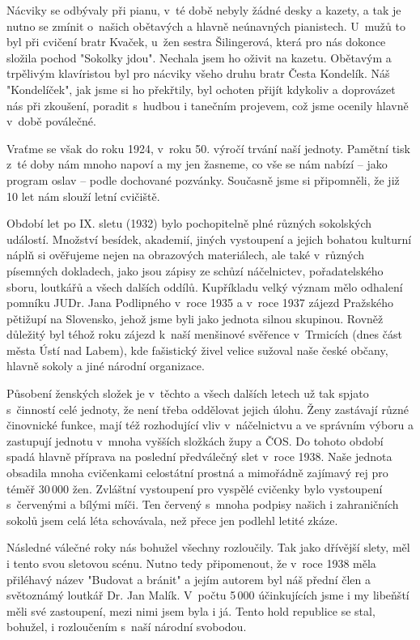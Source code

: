 \documentclass[a5paper, 11pt, twoside]{article}
\begin{document}
Nácviky se odbývaly při pianu, v~té době nebyly žádné desky a kazety, a
tak je nutno se zmínit o~našich obětavých a hlavně neúnavných
pianistech. U~mužů to byl při cvičení bratr Kvaček, u~žen sestra
Šilingerová, která pro nás dokonce složila pochod "Sokolky jdou".
Nechala jsem ho oživit na kazetu. Obětavým a trpělivým klavíristou byl
pro nácviky všeho druhu bratr Česta Kondelík. Náš "Kondelíček", jak
jsme si ho překřtily, byl ochoten přijít kdykoliv a doprovázet nás při
zkoušení, poradit s~hudbou i tanečním projevem, což jsme ocenily hlavně
v~době poválečné.

Vraťme se však do roku 1924, v~roku 50. výročí trvání naší jednoty.
Pamětní tisk z~té doby nám mnoho napoví a my jen žasneme, co vše se nám
nabízí -- jako program oslav -- podle dochované pozvánky. Současně jsme
si připomněli, že již 10 let nám slouží letní cvičiště.

Období let po IX. sletu (1932) bylo pochopitelně plné různých sokolských
událostí. Množství besídek, akademií, jiných vystoupení a jejich bohatou
kulturní náplň si ověřujeme nejen na obrazových materiálech, ale také
v~různých písemných dokladech, jako jsou zápisy ze schůzí náčelnictev,
pořadatelského sboru, loutkářů a všech dalších oddílů. Kupříkladu velký
význam mělo odhalení pomníku JUDr. Jana Podlipného v~roce 1935 a v~roce
1937 zájezd Pražského pětižupí na Slovensko, jehož jsme byli jako
jednota silnou skupinou. Rovněž důležitý byl téhož roku zájezd k~naší
menšinové svěřence v~Trmicích (dnes část města Ústí nad Labem), kde
fašistický živel velice sužoval naše české občany, hlavně sokoly a jiné
národní organizace.

Působení ženských složek je v~těchto a všech dalších letech už tak
spjato s~činností celé jednoty, že není třeba oddělovat jejich úlohu.
Ženy zastávají různé činovnické funkce, mají též rozhodující vliv
v~náčelnictvu a ve správním výboru a zastupují jednotu v~mnoha vyšších
složkách župy a ČOS. Do tohoto období spadá hlavně příprava na poslední
předválečný slet v~roce 1938. Naše jednota obsadila mnoha cvičenkami
celostátní prostná a mimořádně zajímavý rej pro téměř 30\,000 žen.
Zvláštní vystoupení pro vyspělé cvičenky bylo vystoupení s~červenými a
bílými míči. Ten červený s~mnoha podpisy našich i zahraničních sokolů
jsem celá léta schovávala, než přece jen podlehl letité zkáze.

Následné válečné roky nás bohužel všechny rozloučily. Tak jako dřívější
slety, měl i tento svou sletovou scénu. Nutno tedy připomenout, že
v~roce 1938 měla přiléhavý název "Budovat a bránit" a jejím autorem byl
náš přední člen a světoznámý loutkář Dr. Jan Malík. V~počtu 5\,000
účinkujících jsme i my libeňští měli své zastoupení, mezi nimi jsem byla
i já. Tento hold republice se stal, bohužel, i rozloučením s~naší
národní svobodou.
\end{document}
